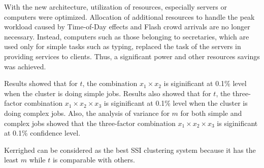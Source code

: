 \documentclass[preprint]{acm_proc_article-sp}
\begin{document}
With the new architecture, utilization of resources, especially servers or computers were optimized. Allocation of additional resources to handle the peak workload caused by Time-of-Day effects and Flash crowd arrivals are no longer necessary. Instead, computers such as those belonging to secretaries, which are used only for simple tasks such as typing, replaced the task of the servers in providing services to clients. Thus, a significant power and other resources savings was achieved.

Results showed that for $t$, the combination ${x_1}\times{x_2}$ is siginificant at 0.1\% level when the cluster is doing simple jobs.  Results also showed that for $t$, the three-factor combination $x_1 \times x_2 \times x_3$ is siginificant at 0.1\% level when the cluster is doing complex jobs. Also, the analysis of variance for $m$ for both simple and complex jobs showed that the three-factor combination $x_1 \times x_2 \times x_3$ is siginificant at 0.1\% confidence level.

Kerrighed can be considered as the best SSI clustering system because it has the least $m$ while $t$ is comparable with others.



\end{document}
